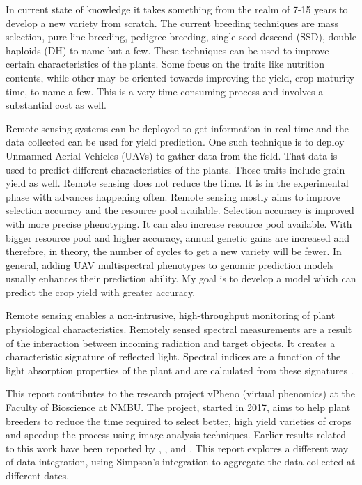 \documentclass[sigconf, nonacm, natbib, screen, balance=False]{acmart}
\begin{document}
In current state of knowledge it takes something from the realm of 7-15 years to develop a new variety from scratch. The current breeding techniques are mass selection, pure-line breeding, pedigree breeding, single seed descend (SSD), double haploids (DH) to name but a few. These techniques can be used to improve certain characteristics of the plants. Some focus on the traits like nutrition contents, while other may be oriented towards improving the yield, crop maturity time, to name a few. This is a very time-consuming process and involves a substantial cost as well.

Remote sensing systems can be deployed to get information in real time and the data collected can be used for yield prediction. One such technique is to deploy Unmanned Aerial Vehicles (UAVs) to gather data from the field. That data is used to predict different characteristics of the plants. Those traits include grain yield as well. Remote sensing does not reduce the time. It is in the experimental phase with advances happening often. Remote sensing mostly aims to improve selection accuracy and the resource pool available. Selection accuracy is improved with more precise phenotyping. It can also increase resource pool available. With bigger resource pool and higher accuracy, annual genetic gains are increased and therefore, in theory, the number of cycles to get a new variety will be fewer. In general, adding UAV multispectral phenotypes to genomic prediction models usually enhances their prediction ability. My goal is to develop a model which can predict the crop yield with greater accuracy.

Remote sensing enables a non-intrusive, high-throughput monitoring of plant physiological characteristics\citep{Tattaris2016}. Remotely sensed spectral measurements are a result of the interaction between incoming radiation and target objects. It creates a characteristic signature of reflected light. Spectral indices are a function of the light absorption properties of the plant and are calculated from these signatures \citep{Tattaris2016}.

This report contributes to the research project vPheno (virtual phenomics) at the Faculty of Bioscience at NMBU. The project, started in 2017, aims to help plant breeders to reduce the time required to select better, high yield varieties of crops and speedup the process using image analysis techniques. Earlier results related to this work have been reported by \citet{burud_bleken}, \citet{grindbakken}, \citet{lied} and \cite{shafiee2021}. This report explores a different way of data integration, using Simpson's integration to aggregate the data collected 
at different dates.
\end{document}
